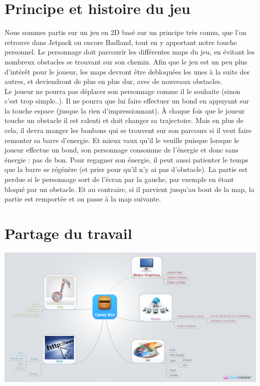 \documentclass [11pt]{report}
\begin{document}
	

\chapter{Principe et histoire du jeu}

		\indent Nous sommes partis sur un jeu en 2D bas\'e sur un principe tr\`es connu, que l'on retrouve dans Jetpack ou encore Badland, tout en y apportant notre touche personnel. Le personnage doit parcourir les différentes maps du jeu, en évitant les nombreux obstacles se trouvant sur son chemin. Afin que le jeu est un peu plus 		d'intérêt pour le joueur, les maps devront être debloquées les unes à la suite des autres, et deviendront de plus en plus dur, avec de nouveaux obstacles.\\

		\indent Le joueur ne pourra pas déplacer son personnage comme il le souhaite (sinon c'est trop simple..). Il ne pourra que lui faire effectuer un bond en appuyant sur la touche espace (jusque la rien d'impressionnant). \`A chaque fois que le joueur touche un obstacle il est ralenti et doit changer sa trajectoire. Mais en plus de cela, il 	devra manger les bonbons qui se trouvent sur son parcours si il veut faire remonter sa barre d'energie. Et mieux vaux qu'il le veuille puisque lorsque le joueur effectue un bond, son personnage consomme de l'énergie et donc sans énergie : pas de bon. Pour regagner son énergie, il peut aussi patienter le temps que la barre se régénère 		(et prier pour qu'il n'y ai pas d'obstacle). La partie est perdue si le personnage sort de l'écran par la gauche, par exemple en étant bloqué par un obstacle. Et au contraire, si il parvient jusqu'au bout de la map, la partie est remportée et on passe à la map suivante.

\newpage 


\chapter {Partage du travail}
\begin{center}
\includegraphics[scale=0.3]{images/Candy_Bird.png}
\end{center}
\end{document}
